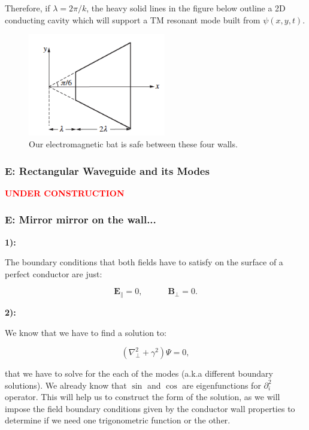 Therefore, if $\lambda=2 \pi / k$, the heavy solid lines in the figure below outline a 2D conducting cavity which will support a TM resonant mode built from $\psi(x, y, t)$.

\begin{figure}[h]
	\includegraphics[width=6cm]{figures/BatinCavity.png}
	\centering
	\caption{Our electromagnetic bat is safe between these four walls.}
\end{figure}

\subsubsection{E: Rectangular Waveguide and its Modes}\label{E: Rectangular Waveguide and its Modes}

\textbf{\textcolor{red}{UNDER CONSTRUCTION}}
\subsubsection{E: Mirror mirror on the wall...}\label{E: Mirror mirror on the wall...}

\textbf{1):}

The boundary conditions that both fields have to satisfy on the surface of a perfect conductor are just:

\begin{equation}
	\mathbf{E}_{\parallel} =0, \quad \quad \quad \mathbf{B}_{\perp} = 0.
\end{equation}

\textbf{2):}

We know that we have to find a solution to:

\begin{equation}\label{waveeq}
	\left(\nabla^{2}_{\perp} +\gamma^{2}\right) \Psi = 0,
\end{equation}

that we have to solve for the each of the modes (a.k.a different boundary solutions). We already know that $\sin$ and $\cos$ are eigenfunctions for $\partial^{2}_{i}$ operator. This will help us to construct the form of the solution, as we will impose the field boundary conditions given by the conductor wall properties to determine if we need one trigonometric function or the other.
	
